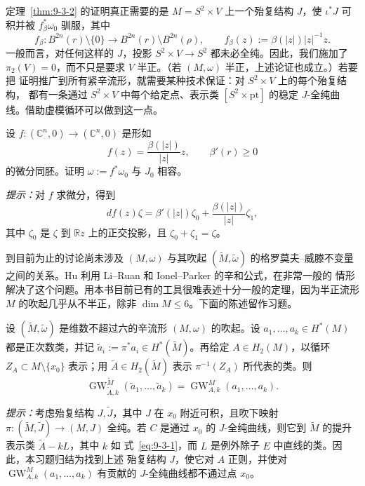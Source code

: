 \begin{remark}\label{rem:9-3-4}
定理~\ref{thm:9-3-2} 的证明真正需要的是 $M=S^2\times V$ 上一个殆复结构 $J$，使
$\iota^*J$ 可积并被 $f_\beta^*\omega_0$ 驯服，其中
\[
  f_\beta:B^{2n}(r)\setminus\{0\}
  \longrightarrow B^{2n}(r)\setminus B^{2n}(\rho),
  \qquad
  f_\beta(z):=\beta(|z|)|z|^{-1}z.
\]
一般而言，对任何这样的 $J$，投影 $S^2\times V\to S^2$ 都未必全纯。因此，我们施加了
$\pi_2(V)=0$，而不只是要求 $V$ 半正。（若 $(M,\omega)$ 半正，上述论证也成立。）若要把
证明推广到所有紧辛流形，就需要某种技术保证：对 $S^2\times V$ 上的每个殆复结构，
都有一条通过 $S^2\times V$ 中每个给定点、表示类 $[S^2\times\mathrm{pt}]$ 的稳定
$J$-全纯曲线。借助虚模循环可以做到这一点。
\end{remark}

\begin{exercise}\label{ex:9-3-5}
设 $f:(\mathbb C^n,0)\to(\mathbb C^n,0)$ 是形如
\[
  f(z)=\frac{\beta(|z|)}{|z|}z,
  \qquad \beta'(r)\ge0
\]
的微分同胚。证明 $\omega:=f^*\omega_0$ 与 $J_0$ 相容。

\emph{提示：}对 $f$ 求微分，得到
\[
  df(z)\zeta=\beta'(|z|)\zeta_0+\frac{\beta(|z|)}{|z|}\zeta_1,
\]
其中 $\zeta_0$ 是 $\zeta$ 到 $\mathbb Rz$ 上的正交投影，且
$\zeta_0+\zeta_1=\zeta$。
\end{exercise}

到目前为止的讨论尚未涉及 $(M,\omega)$ 与其吹起
$(\widetilde M,\widetilde\omega)$ 的格罗莫夫--威滕不变量之间的关系。Hu 
利用 Li--Ruan  和 Ionel--Parker  的辛和公式，在非常一般的
情形解决了这个问题。用本书目前已有的工具很难表述十分一般的定理，因为半正流形 $M$
的吹起几乎从不半正，除非 $\dim M\le6$。下面的陈述留作习题。

\begin{exercise}\label{ex:9-3-6}
设 $(\widetilde M,\widetilde\omega)$ 是维数不超过六的辛流形 $(M,\omega)$ 的吹起。设
$a_1,\ldots,a_k\in H^*(M)$ 都是正次数类，并记
$\widetilde a_i:=\pi^*a_i\in H^*(\widetilde M)$。再给定
$A\in H_2(M)$，以循环 $Z_A\subset M\setminus\{x_0\}$ 表示；用
$\widetilde A\in H_2(\widetilde M)$ 表示 $\pi^{-1}(Z_A)$ 所代表的类。则
\[
  \operatorname{GW}^{\widetilde M}_{\widetilde A,k}
  (\widetilde a_1,\ldots,\widetilde a_k)
  =\operatorname{GW}^{M}_{A,k}(a_1,\ldots,a_k).
\]

\emph{提示：}考虑殆复结构 $J,\widetilde J$，其中 $J$ 在 $x_0$ 附近可积，且吹下映射
$\pi:(\widetilde M,\widetilde J)\to(M,J)$ 全纯。若 $C$ 是通过 $x_0$ 的
$J$-全纯曲线，则它到 $\widetilde M$ 的提升表示类 $\widetilde A-kL$，其中 $k$ 如
式~\eqref{eq:9-3-1}，而 $L$ 是例外除子 $E$ 中直线的类。因此，本习题归结为找到上述
殆复结构 $J$，使它对 $A$ 正则，并使对
$\operatorname{GW}^{M}_{A,k}(a_1,\ldots,a_k)$ 有贡献的 $J$-全纯曲线都不通过点 $x_0$。
\end{exercise}

